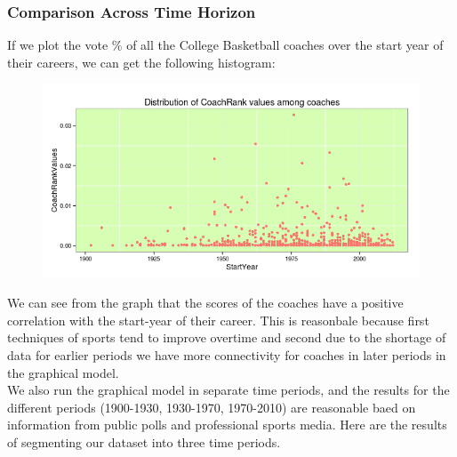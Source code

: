 \documentclass[11pt,notitlepage]{article}
\begin{document}
\subsubsection*{Comparison Across Time Horizon}

If we plot the vote \% of all the College Basketball coaches over the start year of their careers, we can get the following histogram:

\begin{figure}[H]
      \centering
      \includegraphics[width=1\textwidth]{graphs/time_horizon.png}
 \end{figure}

\noindent We can see from the graph that the scores of the coaches have a positive correlation with the start-year of their career. This is reasonbale because first techniques of sports tend to improve overtime and second due to the shortage of data for earlier periods we have more connectivity for coaches in later periods in the graphical model.
\\

\noindent We also run the graphical model in separate time periods, and the results for the different periods (1900-1930, 1930-1970, 1970-2010) are reasonable baed on information from public polls and professional sports media. Here are the results of segmenting our dataset into three time periods.
\end{document}
